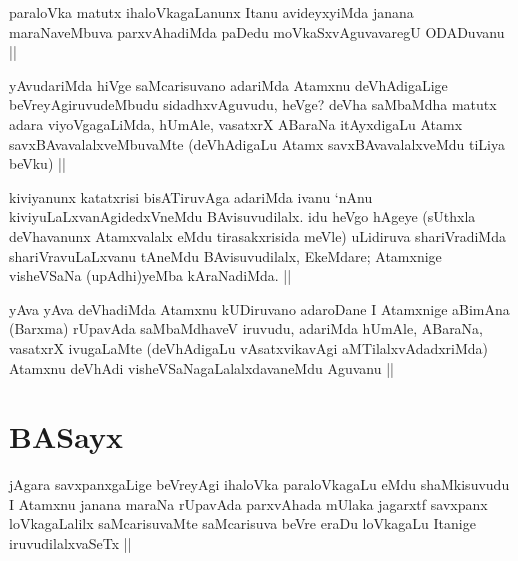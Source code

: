
\begin{artha}
paraloVka matutx ihaloVkagaLanunx Itanu avideyxyiMda janana maraNaveMbuva parxvAhadiMda paDedu moVkaSxvAguvavaregU ODADuvanu ||
\end{artha}


\begin{artha}
yAvudariMda hiVge saMcarisuvano adariMda Atamxnu deVhAdigaLige beVreyAgiruvudeMbudu sidadhxvAguvudu, heVge? deVha saMbaMdha matutx adara viyoVgagaLiMda, hUmAle, vasatxrX ABaraNa itAyxdigaLu Atamx savxBAvavalalxveMbuvaMte (deVhAdigaLu Atamx savxBAvavalalxveMdu tiLiya beVku) ||
\end{artha}


\begin{artha}
kiviyanunx katatxrisi bisATiruvAga adariMda ivanu `nAnu kiviyuLaLxvanAgidedxVneMdu BAvisuvudilalx. idu heVgo hAgeye (sUthxla deVhavanunx Atamxvalalx eMdu tirasakxrisida meVle) uLidiruva shariVradiMda shariVravuLaLxvanu tAneMdu BAvisuvudilalx, EkeMdare; Atamxnige visheVSaNa (upAdhi)yeMba kAraNadiMda. ||
\end{artha}


\begin{artha}
yAva yAva deVhadiMda Atamxnu kUDiruvano adaroDane I Atamxnige aBimAna (Barxma) rUpavAda saMbaMdhaveV iruvudu, adariMda hUmAle, ABaraNa, vasatxrX ivugaLaMte (deVhAdigaLu vAsatxvikavAgi aMTilalxvAdadxriMda) Atamxnu deVhAdi visheVSaNagaLalalxdavaneMdu Aguvanu ||
\end{artha}

\section*{BASayx}

\stext


\begin{artha}
jAgara savxpanxgaLige beVreyAgi ihaloVka paraloVkagaLu eMdu shaMkisuvudu
I Atamxnu janana maraNa rUpavAda parxvAhada mUlaka jagarxtf savxpanx loVkagaLalilx saMcarisuvaMte saMcarisuva beVre eraDu loVkagaLu Itanige iruvudilalxvaSeTx ||
\end{artha}

